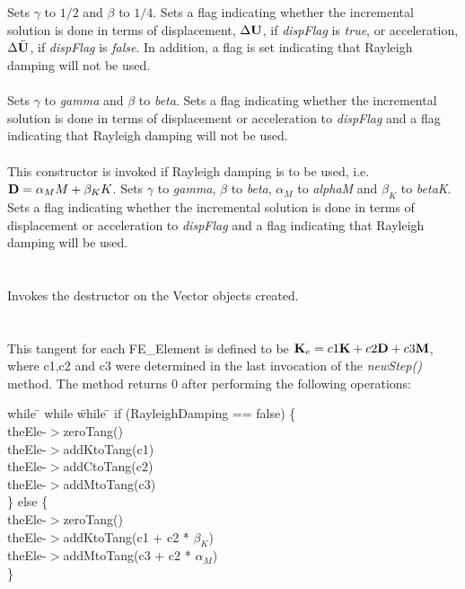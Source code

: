  \\
\\ 
Sets $\gamma$ to $1/2$ and $\beta$ to $1/4$. Sets a flag indicating
whether the incremental solution is done in terms of displacement,
$\Delta {\bf U}$, if {\em dispFlag} is {\em true}, or  
acceleration, $\Delta \ddot {{\bf U}}$, if {\em dispFlag} is {\em false}. In
addition, a flag is set indicating that Rayleigh damping will not be used. \\


\\ 
Sets $\gamma$ to {\em gamma} and $\beta$ to {\em beta}. Sets a flag
indicating whether the incremental solution is done in terms of
displacement or acceleration to {\em dispFlag} and a flag indicating
that Rayleigh damping will not be used. \\


\\ 
This constructor is invoked if Rayleigh damping is to be used, 
i.e. ${\bf D} = \alpha_M M + \beta_K K$. 
Sets $\gamma$ to {\em gamma}, $\beta$ to {\em beta}, $\alpha_M$ to
{\em alphaM} and $\beta_K$ to {\em betaK}. Sets a flag indicating whether the
incremental solution is done in terms of displacement or acceleration
to {\em dispFlag} and a flag indicating that Rayleigh damping will 
be used. \\ 

 \\
\\ 
Invokes the destructor on the Vector objects created. \\

\\
 \\
This tangent for each FE\_Element is defined to be ${\bf K}_e = c1 {\bf K} + c2
{\bf D} + c3 {\bf M}$, where c1,c2 and c3 were determined in the last invocation
of the {\em newStep()} method.  The method returns $0$ after
performing the following operations:
\begin{tabbing}
while \= \+ while \= while \= \kill
if (RayleighDamping == false) \{ \+ \\
theEle-$>$zeroTang() \\
theEle-$>$addKtoTang(c1) \\
theEle-$>$addCtoTang(c2) \\
theEle-$>$addMtoTang(c3)  \- \\
\} else \{ \+ \\
theEle-$>$zeroTang() \\
theEle-$>$addKtoTang(c1 + c2 * $\beta_K$) \\
theEle-$>$addMtoTang(c3 + c2 * $\alpha_M$)  \- \\ 
\}
\end{tabbing}



